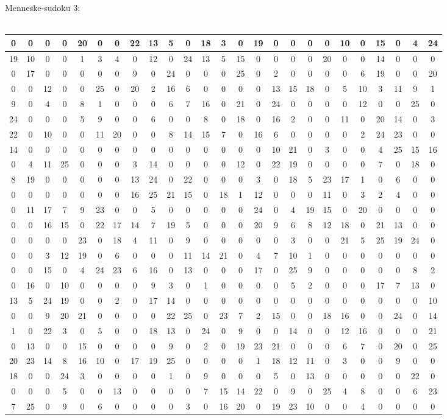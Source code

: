 \documentclass[]{report}
\begin{document}
Menneske-sudoku 3:\\\
\begin{tabular}{|c|c|c|c|c||c|c|c|c|c||c|c|c|c|c||c|c|c|c|c||c|c|c|c|c|}
\hline
0&0&0&0&20&0&0&22&13&5&0&18&3&0&19&0&0&0&0&10&0&15&0&4&24\\\hline
19&10&0&0&1&3&4&0&12&0&24&13&5&15&0&0&0&0&20&0&0&14&0&0&0\\\hline
0&17&0&0&0&0&0&9&0&24&0&0&0&25&0&2&0&0&0&0&6&19&0&0&20\\\hline
0&0&12&0&0&25&0&20&2&16&6&0&0&0&0&13&15&18&0&5&10&3&11&9&1\\\hline
9&0&4&0&8&1&0&0&0&6&7&16&0&21&0&24&0&0&0&0&12&0&0&25&0\\\hline\hline
24&0&0&0&5&9&0&0&6&0&0&8&0&18&0&16&2&0&0&11&0&20&14&0&3\\\hline
22&0&10&0&0&11&20&0&0&8&14&15&7&0&16&6&0&0&0&0&2&24&23&0&0\\\hline
14&0&0&0&0&0&0&0&0&0&0&0&0&0&0&10&21&0&3&0&0&4&25&15&16\\\hline
0&4&11&25&0&0&0&3&14&0&0&0&0&12&0&22&19&0&0&0&0&7&0&18&0\\\hline
8&19&0&0&0&0&0&13&24&0&22&0&0&0&3&0&18&5&23&17&1&0&6&0&0\\\hline\hline
0&0&0&0&0&0&0&16&25&21&15&0&18&1&12&0&0&0&11&0&3&2&4&0&0\\\hline
0&11&17&7&9&23&0&0&5&0&0&0&0&0&24&0&4&19&15&0&20&0&0&0&0\\\hline
0&0&16&15&0&22&17&14&7&19&5&0&0&0&20&9&6&8&12&18&0&21&13&0&0\\\hline
0&0&0&0&23&0&18&4&11&0&9&0&0&0&0&0&3&0&0&21&5&25&19&24&0\\\hline
0&0&3&12&19&0&6&0&0&0&11&14&21&0&4&7&10&1&0&0&0&0&0&0&0\\\hline\hline
0&0&15&0&4&24&23&6&16&0&13&0&0&0&17&0&25&9&0&0&0&0&0&8&2\\\hline
0&16&0&10&0&0&0&0&9&3&0&1&0&0&0&0&5&2&0&0&0&17&7&13&0\\\hline
13&5&24&19&0&0&2&0&17&14&0&0&0&0&0&0&0&0&0&0&0&0&0&0&10\\\hline
0&0&9&20&21&0&0&0&0&22&25&0&23&7&2&15&0&0&18&16&0&0&24&0&14\\\hline
1&0&22&3&0&5&0&0&18&13&0&24&0&9&0&0&14&0&0&12&16&0&0&0&21\\\hline\hline
0&13&0&0&15&0&0&0&0&9&0&2&0&19&23&21&0&0&0&6&7&0&20&0&25\\\hline
20&23&14&8&16&10&0&17&19&25&0&0&0&0&1&18&12&11&0&3&0&0&9&0&0\\\hline
18&0&0&24&3&0&0&0&0&1&0&9&0&0&0&5&0&13&0&0&0&0&0&22&0\\\hline
0&0&0&5&0&0&13&0&0&0&0&7&15&14&22&0&9&0&25&4&8&0&0&6&23\\\hline
7&25&0&9&0&6&0&0&0&0&3&0&16&20&0&19&23&10&0&0&4&0&0&0&0\\\hline
\end{tabular}
\end{document}

